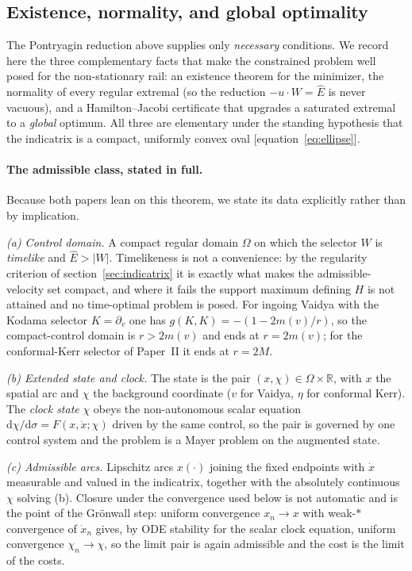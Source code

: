 \documentclass[12pt]{iopart}
\newcommand{\Ehat}{\hat E}
\newcommand{\dd}{\mathrm{d}}
\begin{document}
\subsection{Existence, normality, and global optimality}
\label{sec:control-foundations}
The Pontryagin reduction above supplies only \emph{necessary} conditions. We
record here the three complementary facts that make the constrained problem well
posed for the non-stationary rail: an existence theorem for the minimizer, the
normality of every regular extremal (so the reduction $-u\cdot W=\Ehat$ is never
vacuous), and a Hamilton--Jacobi certificate that upgrades a saturated extremal to
a \emph{global} optimum. All three are elementary under the standing hypothesis
that the indicatrix is a compact, uniformly convex oval [equation~\eqref{eq:ellipse}].

\paragraph{The admissible class, stated in full.} Because both papers lean on
this theorem, we state its data explicitly rather than by implication.

\emph{(a) Control domain.} A compact regular domain $\Omega$ on which the
selector $W$ is \emph{timelike} and $\Ehat>|W|$. Timelikeness is not a
convenience: by the regularity criterion of section~\ref{sec:indicatrix} it is
exactly what makes the admissible-velocity set compact, and where it fails the
support maximum defining $H$ is not attained and no time-optimal problem is
posed. For ingoing Vaidya with the Kodama selector $K=\partial_v$ one has
$g(K,K)=-(1-2m(v)/r)$, so the compact-control domain is $r>2m(v)$ and ends at
$r=2m(v)$; for the conformal-Kerr selector of Paper~II it ends at $r=2M$.

\emph{(b) Extended state and clock.} The state is the pair
$(x,\chi)\in\Omega\times\mathbb R$, with $x$ the spatial arc and $\chi$ the
background coordinate ($v$ for Vaidya, $\eta$ for conformal Kerr). The
\emph{clock state} $\chi$ obeys the non-autonomous scalar equation
$\dd\chi/\dd\sigma=F(x,\dot x;\chi)$ driven by the same control, so the pair is
governed by one control system and the problem is a Mayer problem on the
augmented state.

\emph{(c) Admissible arcs.} Lipschitz arcs $x(\cdot)$ joining the fixed endpoints
with $\dot x$ measurable and valued in the indicatrix, together with the
absolutely continuous $\chi$ solving (b). Closure under the convergence used
below is not automatic and is the point of the Gr\"onwall step: uniform
convergence $x_n\to x$ with weak-$*$ convergence of $\dot x_n$ gives, by ODE
stability for the scalar clock equation, uniform convergence $\chi_n\to\chi$, so
the limit pair is again admissible and the cost is the limit of the costs.
\end{document}
